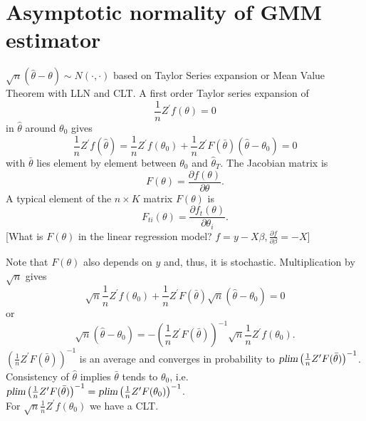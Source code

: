 \documentclass{article}
\begin{document}
\section{Asymptotic normality of GMM estimator}
$\sqrt{n}(\hat{\theta}-\theta) \sim N(\cdot,\cdot)$ based on Taylor Series expansion or Mean Value Theorem with LLN and CLT.
A first order Taylor series expansion of
\begin{equation*}
\frac{1}{n}Z^{\prime }f\left( \theta \right) =0
\end{equation*}%
in $\hat{\theta}$ around $\theta _{0}$ gives%
\begin{equation*}
\frac{1}{n}Z^{\prime }f\left( \hat{\theta}\right) =\frac{1}{n}Z^{\prime
}f\left( \theta _{0}\right) +\frac{1}{n}Z^{\prime }F\left( \bar{\theta}\right) \left( \hat{\theta}-\theta _{0}\right) =0
\end{equation*}%
with $\bar{\theta}$ lies element by element between $\theta_0$ and $\hat{\theta}_T$.
The Jacobian matrix is
\begin{equation*}
F(\theta )=\frac{\partial f(\theta )}{\partial \theta }.
\end{equation*}%
A typical element of the $n\times K$ matrix $F(\theta )$ is%
\begin{equation*}
F_{ti}(\theta )=\frac{\partial f_{t}(\theta )}{\partial \theta _{i}}.
\end{equation*}%
[What is $F(\theta )$ in the linear regression model? $f=y-X\beta, \frac{\partial f}{\partial \beta}=-X$]

Note that $F(\theta )$ also depends on $y$ and, thus, it is stochastic.
Multiplication by $\sqrt{n}$ gives%
\begin{equation*}
\sqrt{n}\frac{1}{n}Z^{\prime }f\left( \theta _{0}\right) +\frac{1}{n}Z^{\prime }F\left( \bar{\theta} \right) \sqrt{n}\left( \hat{\theta}-\theta
_{0}\right) =0
\end{equation*}%
or%
\begin{equation*}
\sqrt{n}\left( \hat{\theta}-\theta _{0}\right) =-\left( \frac{1}{n}Z^{\prime}F\left( \bar{\theta} \right) \right) ^{-1}\sqrt{n}\frac{1}{n}Z^{\prime
}f\left( \theta _{0}\right) .
\end{equation*}
$\left( \frac{1}{n}Z^{\prime}F\left( \bar{\theta} \right) \right) ^{-1}$ is an average and converges in probability to $\textsl{plim} \left( \frac{1}{n}Z^{\prime}F(\bar{\theta}) \right) ^{-1}$. Consistency of $\hat{\theta}$ implies $\bar{\theta}$ tends to $\theta_0$, i.e. $\textsl{plim} \left( \frac{1}{n}Z^{\prime}F(\bar{\theta}) \right) ^{-1}=\textsl{plim} \left( \frac{1}{n}Z^{\prime}F(\theta_0) \right) ^{-1}$.\\
For $\sqrt{n}\frac{1}{n}Z^{\prime}f\left( \theta _{0}\right)$ we have a CLT.\\
\end{document}
